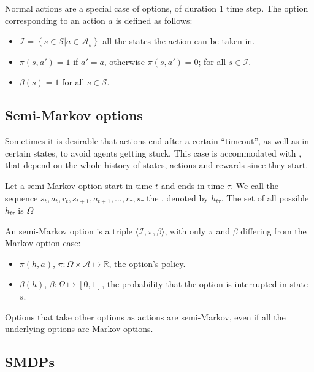 Normal actions are a special case of options, of duration 1 time step. The
option corresponding to an action $a$ is defined as follows:
\begin{itemize}
  \item $\mathcal{I} = \left\{ s \in \mathcal{S} | a \in \mathcal{A}_s \right\}$
  all the states the action can be taken in.
  \item $\pi(s, a') = 1$ if $a'=a$, otherwise $\pi(s, a') = 0$; for all
$s\in\mathcal{I}$.
  \item $\beta(s) = 1$ for all $s\in\mathcal{S}$.
\end{itemize}

\subsection{Semi-Markov options}
Sometimes it is desirable that actions end after a certain ``timeout'', as well
as in certain states, to avoid agents getting stuck. This case is accommodated
with , that depend on the whole history of
states, actions and rewards since they start.

Let a semi-Markov option start in time $t$ and ends in time $\tau$. We call the
sequence $s_t,a_t,r_t,s_{t+1},a_{t+1},\dots,r_\tau,s_\tau$ the
, denoted by $h_{t\tau}$. The set of all possible
$h_{t\tau}$ is $\Omega$

An semi-Markov option is a triple $\langle \mathcal{I}, \pi, \beta \rangle$,
with only $\pi$ and $\beta$ differing from the Markov option case:
\begin{itemize}
  \item $\pi(h, a)$, $\pi : \Omega \times \mathcal{A} \mapsto \mathbb{R}$,
the option's policy.
  \item $\beta(h)$, $\beta : \Omega \mapsto [0, 1]$, the probability that
the option is interrupted in state $s$.
\end{itemize}

Options that take other options as actions are semi-Markov, even if all the
underlying options are Markov options.

\subsection{\acfp{SMDP}}


